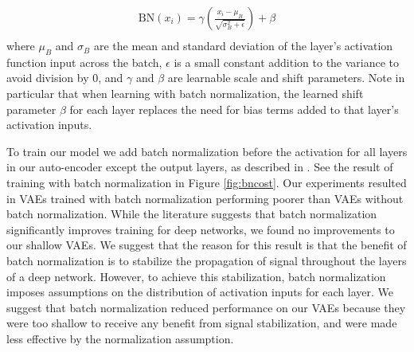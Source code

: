 \documentclass{article} %
\begin{document}
\begin{align*}
    \text{BN}(x_i)=\gamma\left(\frac{x_i-\mu_B}{\sqrt{\sigma_B^2+\epsilon}}\right)+\beta\\
\end{align*} 
where $\mu_B$ and $\sigma_B$ are the mean and standard deviation of the layer's activation function input across the batch, $\epsilon$ is a small constant addition to the variance to avoid division by 0, and $\gamma$ and $\beta$ are learnable scale and shift parameters. Note in particular that when learning with batch normalization, the learned shift parameter $\beta$ for each layer replaces the need for bias terms added to that layer's activation inputs.
\par To train our model we add batch normalization before the activation for all layers in our auto-encoder except the output layers, as described in \cite{Sonderby2016}. See the result of training with batch normalization in Figure \ref{fig:bncost}. Our experiments resulted in VAEs trained with batch normalization performing poorer than VAEs without batch normalization. While the literature suggests that batch normalization significantly improves training for deep networks, we found no improvements to our shallow VAEs. We suggest that the reason for this result is that the benefit of batch normalization is to stabilize the propagation of signal throughout the layers of a deep network. However, to achieve this stabilization, batch normalization imposes assumptions on the distribution of activation inputs for each layer. We suggest that batch normalization reduced performance on our VAEs because they were too shallow to receive any benefit from signal stabilization, and were made less effective by the normalization assumption.
\end{document}
